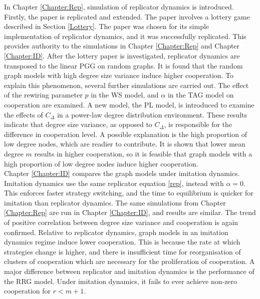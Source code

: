In Chapter \ref{Chapter:Rep}, simulation of replicator dynamics is introduced. Firstly, the paper \cite{RN30} is replicated and extended. The paper involves a lottery game described in Section \ref{Lottery}. The paper was chosen for its simple implementation of replicator dynamics, and it was successfully replicated. This provides authority to the simulations in Chapter \ref{Chapter:Rep} and Chapter \ref{Chapter:ID}. After the lottery paper is investigated, replicator dynamics are transposed to the linear PGG on random graphs. It is found that the random graph models with high degree size variance induce higher cooperation. To explain this phenomenon, several further simulations are carried out. The effect of the rewiring parameter $p$ in the WS model, and $\alpha$ in the TAG model on cooperation are examined. A new model, the PL model, is introduced to examine the effects of $C_\Delta$ in a power-law degree distribution environment. These results indicate that degree size variance, as opposed to $C_\Delta$, is responsible for the difference in cooperation level. A possible explanation is the high proportion of low degree nodes, which are readier to contribute. It is shown that lower mean degree $m$ results in higher cooperation, so it is feasible that graph models with a high proportion of low degree nodes induce higher cooperation.  \\

Chapter \ref{Chapter:ID} compares the graph models under imitation dynamics. Imitation dynamics use the same replicator equation \eqref{rep}, instead with $\alpha=0$. This enforces faster strategy switching, and the time to equilibrium is quicker for imitation than replicator dynamics. The same simulations from Chapter \ref{Chapter:Rep} are run in Chapter \ref{Chapter:ID}, and results are similar. The trend of positive correlation between degree size variance and cooperation is again confirmed. Relative to replicator dynamics, graph models in an imitation dynamics regime induce lower cooperation. This is because the rate at which strategies change is higher, and there is insufficient time for reorganisation of clusters of cooperation which are necessary for the proliferation of cooperation. A major difference between replicator and imitation dynamics is the performance of the RRG model. Under imitation dynamics, it fails to ever achieve non-zero cooperation for $r<m+1$.   \\


 
